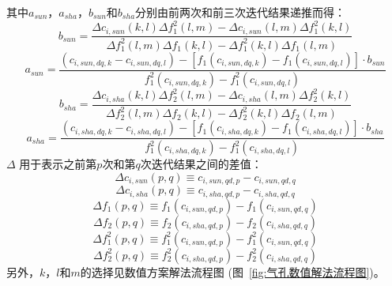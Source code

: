 其中$a_{sun}$，$a_{sha}$，$b_{sun}$和$b_{sha}$分别由前两次和前三次迭代结果递推而得：
\begin{equation}\label{iterbsun}
b_{sun} = \frac{\Delta c_{i,sun}\left(k,l\right)\Delta f^2_1\left(l,m\right)-\Delta c_{i,sun}(l,m) \Delta f^2_1\left(k,l\right)}{\Delta f^2_1\left(l,m\right) \Delta f_1 \left(k,l\right)-\Delta f^2_1\left(k,l\right)\Delta f_1 \left(l,m\right)}
\end{equation}
\begin{equation}\label{iterasun}
a_{sun} = \frac{\left(c_{i,sun,dq,k}-c_{i,sun,dq,l}\right)-\left[f_1(c_{i,sun,dq,k})-f_1(c_{i,sun,dq,l})\right]\cdot b_{sun}}{f^2_1(c_{i,sun,dq,k})-f^2_1(c_{i,sun,dq,l})}
\end{equation}
\begin{equation}\label{iterbsha}
b_{sha} = \frac{\Delta c_{i,sha}\left(k,l\right)\Delta f^2_2\left(l,m\right)-\Delta c_{i,sha}(l,m) \Delta f^2_2\left(k,l\right)}{\Delta f^2_2\left(l,m\right) \Delta f_2 \left(k,l\right)-\Delta f^2_2\left(k,l\right)\Delta f_2 \left(l,m\right)}
\end{equation}
\begin{equation}\label{iterasha}
a_{sha} = \frac{\left(c_{i,sha,dq,k}-c_{i,sha,dq,l}\right)-\left[f_1(c_{i,sha,dq,k})-f_1(c_{i,sha,dq,l})\right]\cdot b_{sha}}{f^2_1(c_{i,sha,dq,k})-f^2_1(c_{i,sha,dq,l})}
\end{equation}
$\Delta$ 用于表示之前第$p$次和第$q$次迭代结果之间的差值：
\begin{equation}
\Delta c_{i,sun}(p,q)\equiv c_{i,sun,qd,p} - c_{i,sun,qd,q} 
\end{equation}
\begin{equation}
\Delta c_{i,sha}(p,q)\equiv c_{i,sha,qd,p} - c_{i,sha,qd,q} 
\end{equation}
\begin{equation}
\Delta f_1 \left(p,q\right)\equiv f_1(c_{i,sun,qd,p})-f_1(c_{i,sun,qd,q})
\end{equation}
\begin{equation}
\Delta f_2 \left(p,q\right)\equiv f_2(c_{i,sha,qd,p})-f_2(c_{i,sha,qd,q})
\end{equation}
\begin{equation}
\Delta f^2_1 \left(p,q\right)\equiv f^2_1(c_{i,sun,qd,p})-f^2_1(c_{i,sun,qd,q})
\end{equation}
\begin{equation}
\Delta f^2_2 \left(p,q\right)\equiv f^2_2(c_{i,sha,qd,p})-f^2_2(c_{i,sha,qd,q})
\end{equation}
另外，$k$，$l$和$m$的选择见数值方案解法流程图 (图~\ref{fig:气孔数值解法流程图})。

